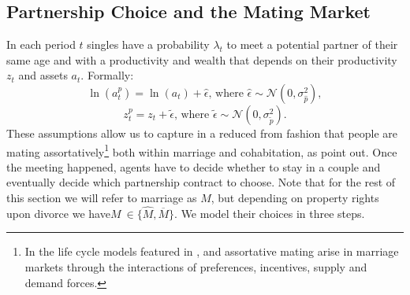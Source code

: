 \documentclass[12pt]{article}
\numberwithin{table}{section}
\begin{document}
\subsection{Partnership Choice and the Mating Market}\label{ssec:marriage_market}
In each period $t$ singles have a probability $\lambda_t$ to meet a potential partner of their same age and with a productivity and wealth that depends on their productivity $z_t$ and assets $a_{t}$. Formally:
\begin{equation}\label{mma}
\ln(a^p_t)=\ln(a_{t})+\hat{\epsilon}\text{, where }\hat{\epsilon}\sim\mathcal{N}(0,\sigma^2_{\hat{p}}),
\end{equation}
\begin{equation}\label{mmz}
z^p_t=z_{t}+\tilde{\epsilon}\text{, where }\tilde{\epsilon}\sim\mathcal{N}(0,\sigma^2_{\tilde{p}}).
\end{equation}
These assumptions allow us to capture in a reduced from fashion that people are mating assortatively\footnote{In the life cycle models featured in \cite{ciscato2019}, \cite{shephard2019} and \cite{reynoso2019} assortative mating arise in marriage markets through the interactions of preferences, incentives, supply and demand forces.} both within marriage and cohabitation, as \cite{gemici2014} point out.
Once the meeting happened, agents have to decide whether to stay in a couple and eventually decide which partnership contract to choose. Note that for the rest of this section we will refer to marriage as $M$, but depending on property rights upon divorce we have$M \ \in\{\hat{M},\overline{M}\}$. We model their choices in three steps. 
\end{document}

